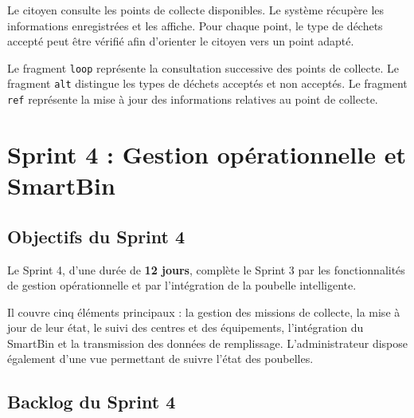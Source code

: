 {Le citoyen consulte les points de collecte disponibles. Le système récupère les informations enregistrées et les affiche. Pour chaque point, le type de déchets accepté peut être vérifié afin d'orienter le citoyen vers un point adapté.

Le fragment \texttt{loop} représente la consultation successive des points de collecte. Le fragment \texttt{alt} distingue les types de déchets acceptés et non acceptés. Le fragment \texttt{ref} représente la mise à jour des informations relatives au point de collecte.

\label{fig:r2_s3_seq_points}


\section{Sprint 4 : Gestion opérationnelle et SmartBin}
\label{sec:r2_sprint4}

\subsection{Objectifs du Sprint 4}

Le Sprint 4, d'une durée de \textbf{12 jours}, complète le Sprint 3 par les fonctionnalités de gestion opérationnelle et par l'intégration de la poubelle intelligente.

Il couvre cinq éléments principaux : la gestion des missions de collecte, la mise à jour de leur état, le suivi des centres et des équipements, l'intégration du SmartBin et la transmission des données de remplissage. L'administrateur dispose également d'une vue permettant de suivre l'état des poubelles.

\subsection{Backlog du Sprint 4}

}
